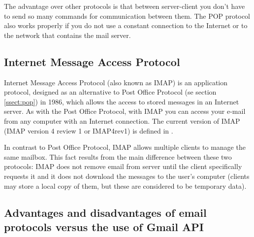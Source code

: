 The advantage over other protocols is that between server-client you don't have to send so many commands for communication between them. The POP protocol also works properly if you do not use a constant connection to the Internet or to the network that contains the mail server.

\subsection{Internet Message Access Protocol} \label{ssect:imap}

Internet Message Access Protocol (also known as IMAP) is an application protocol, designed as an alternative to Post Office Protocol (se section \ref{ssect:pop}) in 1986, which allows the access to stored messages in an Internet server. As with the Post Office Protocol, with IMAP you can access your e-mail from any computer with an Internet connection. The current version of IMAP (IMAP version 4 review 1 or IMAP4rev1) is defined in \cite{rfc3501}.

In contrast to Post Office Protocol, IMAP allows multiple clients to manage the same mailbox. This fact results from the main difference between these two protocols: IMAP does not remove email from server until the client specifically requests it and it does not download the messages to the user's computer (clients may store a local copy of them, but these are considered to be temporary data).

\subsection{Advantages and disadvantages of email protocols versus the use of Gmail API} \label{ssect:protvsapi}
